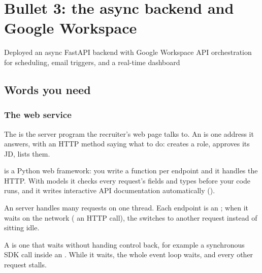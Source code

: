 \chapter{Bullet 3: the async backend and Google Workspace}
\label{ch:backend}

\begin{cvline}
Deployed an async FastAPI backend with Google Workspace API orchestration for scheduling, email triggers, and a real-time dashboard
\end{cvline}

\section{Words you need}

\subsection*{The web service}

\begin{definition}
The  is the server program the recruiter's web page talks to. An  is one address it answers, with an HTTP method saying what to do:  creates a role,  approves its JD,  lists them.
\end{definition}

\begin{definition}
 is a Python web framework: you write a function per endpoint and it handles the HTTP. With  models it checks every request's fields and types before your code runs, and it writes interactive API documentation automatically ().
\end{definition}

\begin{definition}
An  server handles many requests on one thread. Each endpoint is an ; when it waits on the network ( an HTTP call), the  switches to another request instead of sitting idle.
\end{definition}

\begin{definition}
A  is one that waits without handing control back, for example a synchronous SDK call inside an . While it waits, the whole event loop waits, and every other request stalls.
\end{definition}


